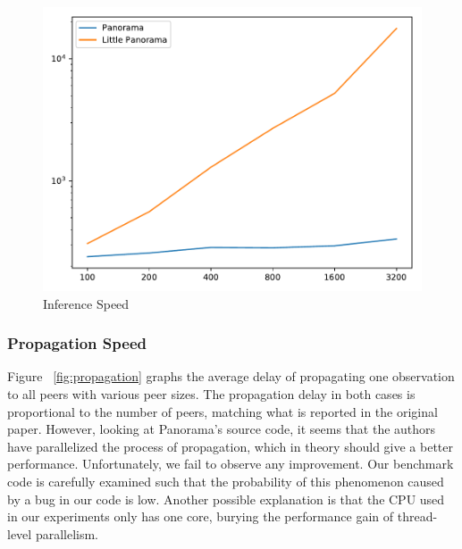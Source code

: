 \begin{figure}[!tb]
\centering
\includegraphics[scale=0.4]{figs/inference.pdf}
\vspace{-1em}
\caption{Inference Speed
\label{fig:inference}
}
\end{figure}

\subsubsection{Propagation Speed} Figure ~\ref{fig:propagation} graphs the average delay of propagating one observation to all peers with various peer sizes. The propagation delay in both cases is proportional to the number of peers, matching what is reported in the original paper. However, looking at Panorama's source code, it seems that the authors have parallelized the process of propagation, which in theory should give a better performance. Unfortunately, we fail to observe any improvement. Our benchmark code is carefully examined such that the probability of this phenomenon caused by a bug in our code is low. Another possible explanation is that the CPU used in our experiments only has one core, burying the performance gain of thread-level parallelism.

